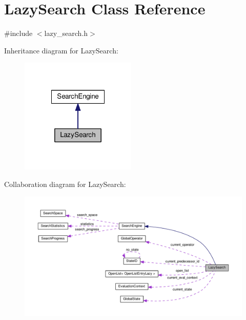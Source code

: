 \hypertarget{classLazySearch}{\section{Lazy\-Search Class Reference}
\label{classLazySearch}
}


{\ttfamily \#include $<$lazy\-\_\-search.\-h$>$}



Inheritance diagram for Lazy\-Search\-:
\nopagebreak
\begin{figure}[H]
\begin{center}
\leavevmode
\includegraphics[width=156pt]{classLazySearch__inherit__graph}
\end{center}
\end{figure}


Collaboration diagram for Lazy\-Search\-:
\nopagebreak
\begin{figure}[H]
\begin{center}
\leavevmode
\includegraphics[width=350pt]{classLazySearch__coll__graph}
\end{center}
\end{figure}
